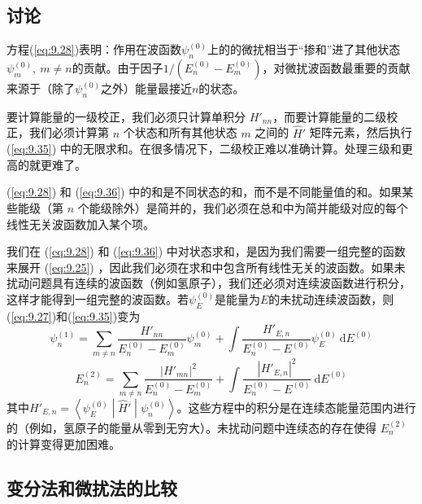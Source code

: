 \subsection*{讨论}

    方程(\ref{eq:9.28})表明：作用在波函数$\psi_n^{\left(0\right)}$上的的微扰相当于“掺和”进了其他状态$\psi_m^{\left(0\right)},\:m \neq n$的贡献。由于因子$1/\left(E_n^{\left(0\right)} - E_m^{\left(0\right)}\right)$，对微扰波函数最重要的贡献来源于（除了$\psi_n^{\left(0\right)}$之外）能量最接近$n$的状态。

    要计算能量的一级校正，我们必须只计算单积分 $H'_{nn}$，而要计算能量的二级校正，我们必须计算第 $n$ 个状态和所有其他状态 $m$ 之间的 $\hat{H}'$ 矩阵元素，然后执行 (\ref{eq:9.35}) 中的无限求和。在很多情况下，二级校正难以准确计算。处理三级和更高的就更难了。

    (\ref{eq:9.28}) 和 (\ref{eq:9.36}) 中的和是不同状态的和，而不是不同能量值的和。如果某些能级（第 $n$ 个能级除外）是简并的，我们必须在总和中为简并能级对应的每个线性无关波函数加入某个项。

    我们在 (\ref{eq:9.28}) 和 (\ref{eq:9.36}) 中对状态求和，是因为我们需要一组完整的函数来展开 (\ref{eq:9.25}) ，因此我们必须在求和中包含所有线性无关的波函数。如果未扰动问题具有连续的波函数（例如氢原子），我们还必须对连续波函数进行积分，这样才能得到一组完整的波函数。若$\psi_E^{\left(0\right)}$是能量为$E$的未扰动连续波函数，则(\ref{eq:9.27})和(\ref{eq:9.35})变为
    \begin{equation*}
        \psi_n^{\left(1\right)} = \sum_{m \neq n} \frac{H'_{nn}}{E_n^{\left(0\right)} - E_m^{\left(0\right)}} \psi_m^{\left(0\right)} + \int \frac{H'_{E,n}}{E_n^{\left(0\right)} - E^{\left(0\right)}} \psi_E^{\left(0\right)} \:\mathrm{d}E^{\left(0\right)}
    \end{equation*}
    \begin{equation}
        E_n^{\left(2\right)} = \sum_{m \neq n} \frac{\left|H'_{mn}\right|^2}{E_n^{\left(0\right)} - E_m^{\left(0\right)}} + \int \frac{\left|H'_{E,n}\right|^2}{E_n^{\left(0\right)} - E^{\left(0\right)}} \:\mathrm{d}E^{\left(0\right)}
        \label{eq:9.37}
    \end{equation}
    其中$H'_{E,n} = \left\langle \psi_E^{\left(0\right)} \middle| \hat{H}' \middle| \psi_n^{\left(0\right)} \right\rangle$。这些方程中的积分是在连续态能量范围内进行的（例如，氢原子的能量从零到无穷大）。未扰动问题中连续态的存在使得 $E_n^{\left(2\right)}$ 的计算变得更加困难。

\subsection*{变分法和微扰法的比较}

